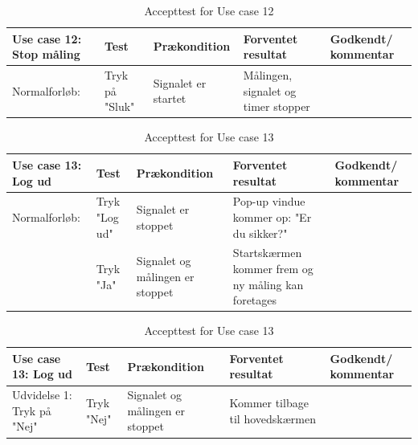 \begin{table}[H]
\caption{Accepttest for Use case 12}\label{tab:tabel8}
\begin{tabular}{|>{\raggedright\arraybackslash}p{2.5cm}| >{\raggedright\arraybackslash}p{2.9cm} | >{\raggedright\arraybackslash}p{2.9cm} | >{\raggedright\arraybackslash}p{2.9cm} | >{\raggedright\arraybackslash}p{2.8cm} |}
   \hline
   \textbf{Use case 12: Stop måling } &\textbf{Test}& \textbf{Prækondition} & \textbf{Forventet resultat} & \textbf{Godkendt/ kommentar}\\ \hline
   Normalforløb:& Tryk på "Sluk" & Signalet er startet & Målingen, signalet og timer stopper &\\\hline
\end{tabular}
\end{table}

\begin{table}[H]
\caption{Accepttest for Use case 13}\label{tab:tabel8}
\begin{tabular}{|>{\raggedright\arraybackslash}p{2.5cm}| >{\raggedright\arraybackslash}p{2.9cm} | >{\raggedright\arraybackslash}p{2.9cm} | >{\raggedright\arraybackslash}p{2.9cm} | >{\raggedright\arraybackslash}p{2.8cm} |}
   \hline
   \textbf{Use case 13: Log ud } &\textbf{Test}& \textbf{Prækondition} & \textbf{Forventet resultat} & \textbf{Godkendt/ kommentar}\\ \hline
   Normalforløb:& Tryk "Log ud" & Signalet er stoppet & Pop-up vindue kommer op: "Er du sikker?" &\\\hline
   &Tryk "Ja"&Signalet og målingen er stoppet& Startskærmen kommer frem og ny måling kan foretages &\\\hline
\end{tabular}
\end{table}


\begin{table}[H]
\caption{Accepttest for Use case 13}\label{tab:tabel8}
\begin{tabular}{|>{\raggedright\arraybackslash}p{2.5cm}| >{\raggedright\arraybackslash}p{2.9cm} | >{\raggedright\arraybackslash}p{2.9cm} | >{\raggedright\arraybackslash}p{2.9cm} | >{\raggedright\arraybackslash}p{2.8cm} |}
   \hline
   \textbf{Use case 13: Log ud } &\textbf{Test}& \textbf{Prækondition} & \textbf{Forventet resultat} & \textbf{Godkendt/ kommentar}\\ \hline
Udvidelse 1: Tryk på "Nej" &Tryk "Nej" & Signalet og målingen er stoppet & Kommer tilbage til hovedskærmen &\\\hline
\end{tabular}
\end{table}



